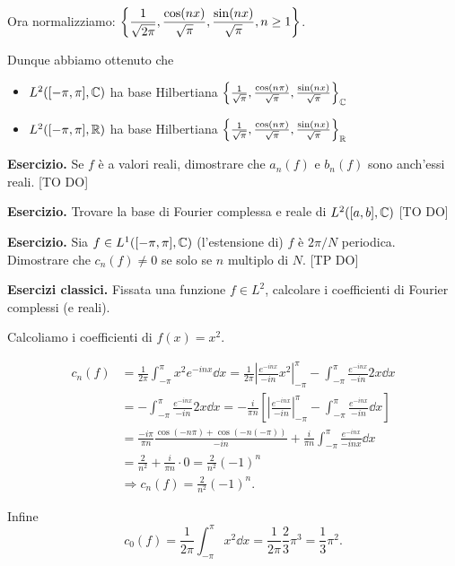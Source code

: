 Ora normalizziamo: $\displaystyle \left\{ \frac{1}{\sqrt{2\pi}}, \frac{\cos(nx)}{\sqrt{\pi}}, \frac{\sin(nx)}{\sqrt{\pi}}, n \geq 1 \right\}$.

Dunque abbiamo ottenuto che
\begin{itemize}

	\item $L^2( [-\pi,\pi], \mathbb C)$ ha base Hilbertiana $\left\{ \frac{1}{\sqrt{\pi}}, \frac{\cos(n\pi)}{\sqrt{\pi}}, \frac{\sin(nx)}{\sqrt{\pi}} \right\}_{\mathbb C}$


	\item $L^2( [-\pi,\pi], \mathbb R)$ ha base Hilbertiana $\left\{ \frac{1}{\sqrt{\pi}}, \frac{\cos(n\pi)}{\sqrt{\pi}}, \frac{\sin(nx)}{\sqrt{\pi}} \right\}_{\mathbb R}$ 

\end{itemize}

\textbf{Esercizio.}  Se $f$ è a valori reali, dimostrare che $a_n(f)$ e $b_n(f)$ sono anch'essi reali. [TO DO]


\textbf{Esercizio.} Trovare la base di Fourier complessa e reale di $L^2([a,b], \mathbb C) $ [TO DO]


\textbf{Esercizio.} Sia $f \in L^1([-\pi,\pi], \mathbb C) $ (l'estensione di) $f$ è $2\pi / N$ periodica. Dimostrare che $c_n(f) \neq 0$ se solo se $n$ multiplo di $N$. [TP DO]


\textbf{Esercizi classici.} Fissata una funzione $f \in L^2$, calcolare i coefficienti di Fourier complessi (e reali).

Calcoliamo i coefficienti di $f(x) = x^2$.

\begin{align*}
	c_n(f) & = \frac{1}{2\pi} \int_{-\pi}^\pi x^2 e^{-inx} \dd x = \frac{1}{2\pi} \left| \frac{e^{-inx}}{-in} x^2 \right|_{-\pi}^\pi - \int_{-\pi}^\pi \frac{e^{-inx}}{-in} 2x \dd x \\
	& = - \int_{-\pi}^\pi \frac{e^{-inx}}{-in} 2x \dd x = -\frac{i}{\pi n} \left[ \left| \frac{e^{-inx}}{-in} \right|_{-\pi}^\pi - \int_{-\pi}^\pi \frac{e^{-inx}}{-in} \dd x  \right] \\
	& = \frac{-i \pi}{\pi n} \frac{\cos(-n\pi) + \cos(-n (-\pi))}{-in} + \frac{i}{\pi n} \int_{-\pi}^\pi \frac{e^{-inx}}{-inx} \dd x \\
	& = \frac{2}{n^2} + \frac{i}{\pi n} \cdot 0 = \frac{2}{n^2} (-1)^n \\
	& \Longrightarrow c_n(f) = \frac{2}{n^2} (-1)^n.
\end{align*}

Infine
%
$$
c_0(f) = \frac{1}{2\pi} \int_{-\pi}^\pi x^2 \dd x = \frac{1}{2\pi} \frac{2}{3} \pi^3 = \frac{1}{3} \pi^2.
$$
%

